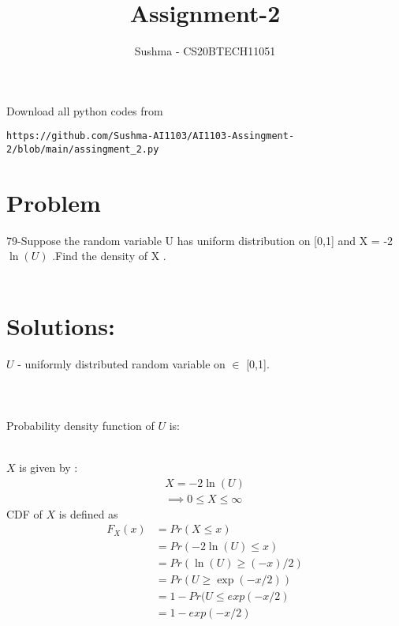 \documentclass[journal,12pt,twocolumn]{IEEEtran}
\begin{document}
     \def\rightbox#1{\makebox[0in][r]{#1}}
     \def\centbox#1{\makebox[0in]{#1}}
     \def\topbox#1{\raisebox{-\baselineskip}[0in][0in]{#1}}
     \def\midbox#1{\raisebox{-0.5\baselineskip}[0in][0in]{#1}}
\vspace{3cm}
\title{Assignment-2}
\author{Sushma - CS20BTECH11051}
\maketitle
\newpage
\bigskip
\renewcommand{\thefigure}{\theenumi}
\renewcommand{\thetable}{\theenumi}
Download all python codes from 
\begin{lstlisting}
https://github.com/Sushma-AI1103/AI1103-Assingment-2/blob/main/assingment_2.py
\end{lstlisting}

 \section{Problem}{79}-Suppose the random variable U has uniform distribution on [0,1] and X = -2$\ln(U)$ .Find the  density of X  . \\ \\
 
\section{Solutions:}
$U$ - uniformly distributed random variable on $\in$ [0,1]. \\ \\  \\ \\ 
Probability density function of $U$ is: \\ \\
 $X$ is given by :
\begin{align}
  X = -2 \ln(U) \\
\implies    0 \leq X \leq \infty
\end{align}
CDF of  $X$ is defined as \\
\begin{align}
    F_X(x) &= Pr(X \le x) \\
           &= Pr( -2 \ln(U)\le x) \\
           &= Pr(\ln(U) \ge( -x) /2)\\
           &= Pr (U \ge \exp(-x/2))\\
           &= 1 - Pr(U \le exp(-x/2)\\
           &= 1 - exp(-x/2) 
\end{align}
\end{document}
